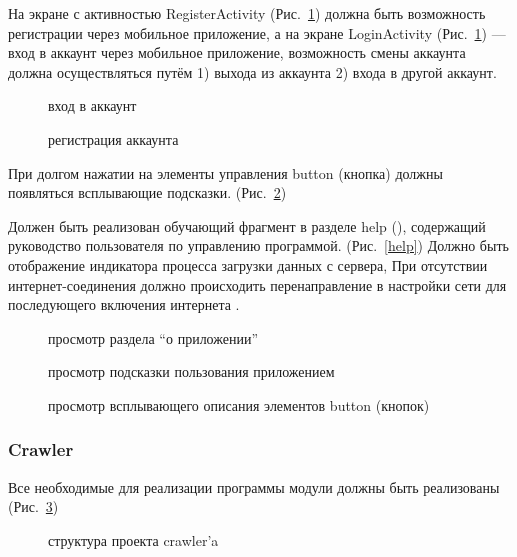 На экране с активностью RegisterActivity (Рис.~\ref{register}) должна быть возможность регистрации
через мобильное приложение, а на экране LoginActivity (Рис.~\ref{register}) --- вход в аккаунт через
мобильное приложение, возможность смены аккаунта должна осуществляться путём 1) выхода из аккаунта 2) входа в другой аккаунт.

\begin{figure}[h!]
    \centering
    \caption{\small{вход в аккаунт}}
    \label{login}
    \endminipage\hfill
    \caption{\small{регистрация аккаунта}}
    \label{register}
    \endminipage{}
\end{figure}


При долгом нажатии на элементы
управления button (кнопка) должны появляться всплывающие подсказки. (Рис.~\ref{hint})

Должен быть реализован обучающий фрагмент в разделе help (), содержащий руководство
пользователя по управлению программой. (Рис.~\ref{help})
Должно быть отображение индикатора процесса загрузки данных с сервера,
При отсутствии интернет-соединения должно происходить перенаправление в настройки сети для
последующего включения интернета .

\begin{figure}[h!]
    \centering
    \caption{\small{просмотр раздела ``о приложении''}}
    \endminipage\hfill
    \caption{\small{просмотр подсказки пользования приложением}}
    \label{help}
    \endminipage\hfill
    \caption{\small{просмотр всплывающего описания элементов button (кнопок)}}
    \label{hint}
    \endminipage{}
\end{figure}

\newpage
\subsubsection{Crawler}
Все необходимые для реализации программы модули должны быть реализованы (Рис.~\ref{tree})

\begin{figure}[h!]
    \centering
    \caption{\small{структура проекта crawler'a}}
    \label{tree}
\end{figure}

